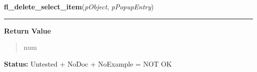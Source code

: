    \label{xformslib:library:fl_delete_select_item}

    \vspace{0.5ex}

\hspace{.8\funcindent}\begin{boxedminipage}{\funcwidth}

    \raggedright \textbf{fl\_delete\_select\_item}(\textit{pObject}, \textit{pPopupEntry})

    \vspace{-1.5ex}

    \rule{\textwidth}{0.5\fboxrule}
\setlength{\parskip}{2ex}
\setlength{\parskip}{1ex}
      \textbf{Return Value}
    \vspace{-1ex}

      \begin{quote}
      num

      \end{quote}

\textbf{Status:} Untested + NoDoc + NoExample = NOT OK



    \end{boxedminipage}

    \label{xformslib:library:fl_set_select_items}

    \vspace{0.5ex}

